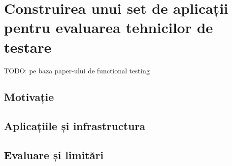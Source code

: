 \chapter{Construirea unui set de aplicații pentru evaluarea 
tehnicilor de testare}

TODO: pe baza paper-ului de functional testing

\section{Motivație}

\section{Aplicațiile și infrastructura}

\section{Evaluare și limitări}